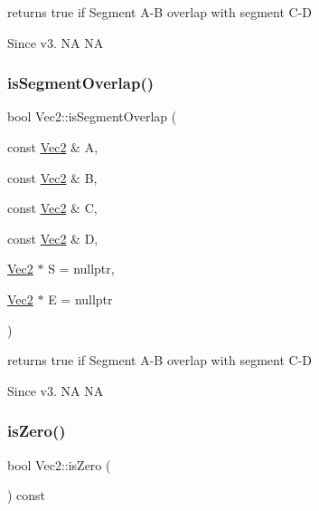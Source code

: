 returns true if Segment A-\/B overlap with segment C-\/D \begin{DoxySince}{Since}
v3.  NA  NA 
\end{DoxySince}
\mbox{\label{classVec2_a99d2d2f5edf75476ba538ca19f2fb543}} 
\subsubsection{\texorpdfstring{is\+Segment\+Overlap()}{isSegmentOverlap()}\hspace{0.1cm}{\footnotesize\ttfamily [2/2]}}
{\footnotesize\ttfamily bool Vec2\+::is\+Segment\+Overlap (\begin{DoxyParamCaption}\item[{const \hyperlink{classVec2}{Vec2} \&}]{A,  }\item[{const \hyperlink{classVec2}{Vec2} \&}]{B,  }\item[{const \hyperlink{classVec2}{Vec2} \&}]{C,  }\item[{const \hyperlink{classVec2}{Vec2} \&}]{D,  }\item[{\hyperlink{classVec2}{Vec2} $\ast$}]{S = {\ttfamily nullptr},  }\item[{\hyperlink{classVec2}{Vec2} $\ast$}]{E = {\ttfamily nullptr} }\end{DoxyParamCaption})\hspace{0.3cm}{\ttfamily [static]}}

returns true if Segment A-\/B overlap with segment C-\/D \begin{DoxySince}{Since}
v3.  NA  NA 
\end{DoxySince}
\mbox{\label{classVec2_ad399155b1760c192c1afafdb5d7ccea3}} 
\subsubsection{\texorpdfstring{is\+Zero()}{isZero()}\hspace{0.1cm}{\footnotesize\ttfamily [1/2]}}
{\footnotesize\ttfamily bool Vec2\+::is\+Zero (\begin{DoxyParamCaption}{ }\end{DoxyParamCaption}) const\hspace{0.3cm}{\ttfamily [inline]}}

